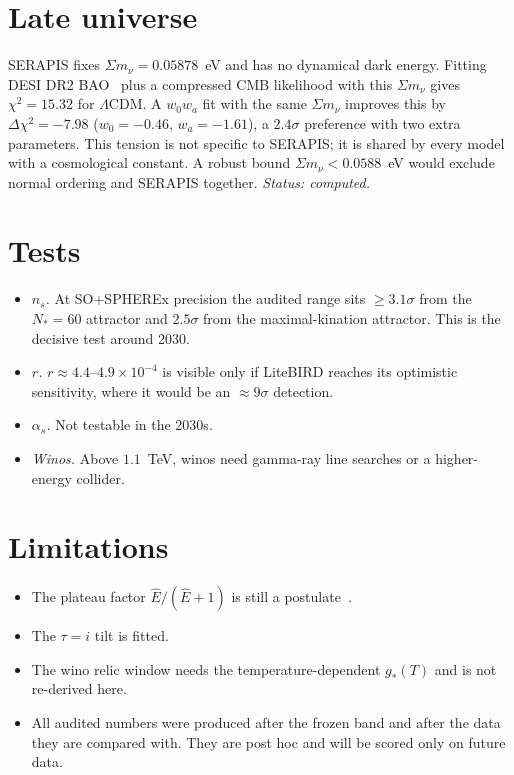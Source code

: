 \documentclass[aps,prd,twocolumn,superscriptaddress,nofootinbib,showkeys]{revtex4-2}
\begin{document}
\section{Late universe}
SERAPIS fixes $\Sigma m_\nu=0.05878$~eV and has no dynamical dark energy. Fitting DESI DR2 BAO~\cite{DESI} plus a compressed CMB likelihood with this $\Sigma m_\nu$ gives $\chi^2=15.32$ for $\Lambda$CDM. A $w_0w_a$ fit with the same $\Sigma m_\nu$ improves this by $\Delta\chi^2=-7.98$ ($w_0=-0.46$, $w_a=-1.61$), a $2.4\sigma$ preference with two extra parameters. This tension is not specific to SERAPIS; it is shared by every model with a cosmological constant. A robust bound $\Sigma m_\nu<0.0588$~eV would exclude normal ordering and SERAPIS together. \emph{Status: computed.}

\section{Tests}
\begin{itemize}
\item \emph{$n_s$.} At SO+SPHEREx precision the audited range sits $\ge3.1\sigma$ from the $N_*=60$ attractor and $2.5\sigma$ from the maximal-kination attractor. This is the decisive test around 2030.
\item \emph{$r$.} $r\approx4.4$--$4.9\times10^{-4}$ is visible only if LiteBIRD reaches its optimistic sensitivity, where it would be an $\approx9\sigma$ detection.
\item \emph{$\alpha_s$.} Not testable in the 2030s.
\item \emph{Winos.} Above $1.1$~TeV, winos need gamma-ray line searches or a higher-energy collider.
\end{itemize}

\section{Limitations}
\begin{itemize}
\item The plateau factor $\hat E/(\hat E+1)$ is still a postulate~\cite{P2,P3}.
\item The $\tau=i$ tilt is fitted.
\item The wino relic window needs the temperature-dependent $g_*(T)$ and is not re-derived here.
\item All audited numbers were produced after the frozen band and after the data they are compared with. They are post hoc and will be scored only on future data.
\end{itemize}
\end{document}
